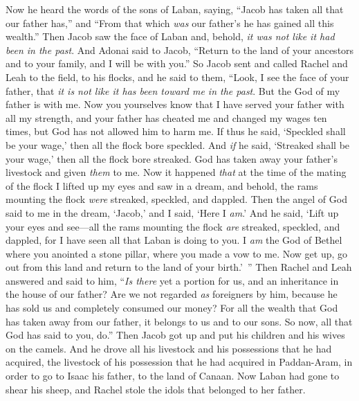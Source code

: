 \begin{biblechapter} %
 Now he heard the words of the sons of Laban, saying, “Jacob has taken all that our father has,” and “From that which \textit{was} our father’s he has gained all this wealth.”
\verse Then Jacob saw the face of Laban and, behold, \textit{it was not like it had been in the past}.
\verse And Adonai said to Jacob, “Return to the land of your ancestors and to your family, and I will be with you.”
\verse So Jacob sent and called Rachel and Leah to the field, to his flocks,
\verse and he said to them, “Look, I see the face of your father, that \textit{it is not like it has been toward me in the past}. But the God of my father is with me.
\verse Now you yourselves know that I have served your father with all my strength,
\verse and your father has cheated me and changed my wages ten times, but God has not allowed him to harm me.
\verse If thus he said, ‘Speckled shall be your wage,’ then all the flock bore speckled. And \textit{if} he said, ‘Streaked shall be your wage,’ then all the flock bore streaked.
\verse God has taken away your father’s livestock and given \textit{them} to me.
\verse Now it happened \textit{that} at the time of the mating of the flock I lifted up my eyes and saw in a dream, and behold, the rams mounting the flock \textit{were} streaked, speckled, and dappled.
\verse Then the angel of God said to me in the dream, ‘Jacob,’ and I said, ‘Here I \textit{am}.’
\verse And he said, ‘Lift up your eyes and see—all the rams mounting the flock \textit{are} streaked, speckled, and dappled, for I have seen all that Laban is doing to you.
\verse I \textit{am} the God of Bethel where you anointed a stone pillar, where you made a vow to me. Now get up, go out from this land and return to the land of your birth.’ ”
\verse Then Rachel and Leah answered and said to him, “\textit{Is there} yet a portion for us, and an inheritance in the house of our father?
\verse Are we not regarded \textit{as} foreigners by him, because he has sold us and completely consumed our money?
\verse For all the wealth that God has taken away from our father, it belongs to us and to our sons. So now, all that God has said to you, do.”
\verse Then Jacob got up and put his children and his wives on the camels.
\verse And he drove all his livestock and his possessions that he had acquired, the livestock of his possession that he had acquired in Paddan-Aram, in order to go to Isaac his father, to the land of Canaan.
\verse Now Laban had gone to shear his sheep, and Rachel stole the idols that belonged to her father.

\end{biblechapter}
